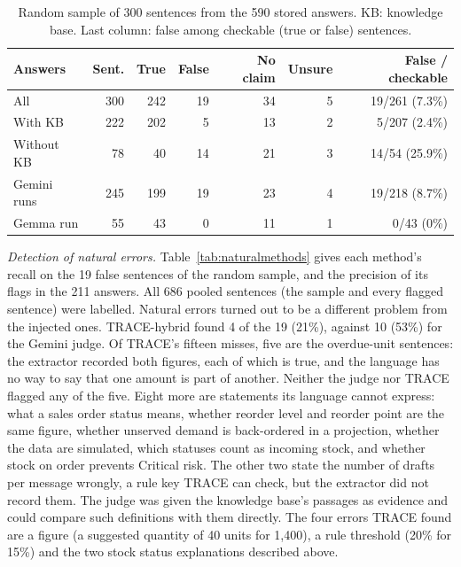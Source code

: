 \documentclass[journal]{IEEEtran}
\renewcommand{\paragraph}[1]{\par\textit{#1}\enspace}
\begin{document}
\begin{table}[t]
\centering\footnotesize
\caption{Random sample of 300 sentences from the 590 stored answers. KB: knowledge base. Last column: false
among checkable (true or false) sentences.}
\label{tab:natural}
\setlength{\tabcolsep}{3pt}
\begin{tabular}{@{}lrrrrrr@{}}
\toprule
Answers & Sent. & True & False & No claim & Unsure & False / checkable \\
\midrule
All & 300 & 242 & 19 & 34 & 5 & 19/261 (7.3\%) \\
With KB & 222 & 202 & 5 & 13 & 2 & 5/207 (2.4\%) \\
Without KB & 78 & 40 & 14 & 21 & 3 & 14/54 (25.9\%) \\
Gemini runs & 245 & 199 & 19 & 23 & 4 & 19/218 (8.7\%) \\
Gemma run & 55 & 43 & 0 & 11 & 1 & 0/43 (0\%) \\
\bottomrule
\end{tabular}
\end{table}

\paragraph{Detection of natural errors.} Table~\ref{tab:naturalmethods} gives each method's recall on the
19 false sentences of the random sample, and the precision of its flags in the 211 answers. All 686 pooled
sentences (the sample and every flagged sentence) were labelled. Natural errors turned out to be a
different problem from the injected ones. TRACE-hybrid found 4 of the 19 (21\%), against 10 (53\%) for the
Gemini judge. Of TRACE's fifteen misses, five are the overdue-unit sentences: the extractor recorded both
figures, each of which is true, and the language has no way to say that one amount is part of another.
Neither the judge nor TRACE flagged any of the five. Eight more are statements its language cannot express: what a sales order
status means, whether reorder level and reorder point are the same figure, whether unserved demand is
back-ordered in a projection, whether the data are simulated, which statuses count as incoming stock, and
whether stock on order prevents Critical risk. The other two state the number of drafts per message wrongly,
a rule key TRACE can check, but the extractor did not record them. The judge was given the knowledge base's
passages as evidence and could compare such definitions with them directly. The four errors TRACE found are
a figure (a suggested quantity of 40 units for 1,400), a rule threshold (20\% for 15\%) and the two stock
status explanations described above.
\end{document}
